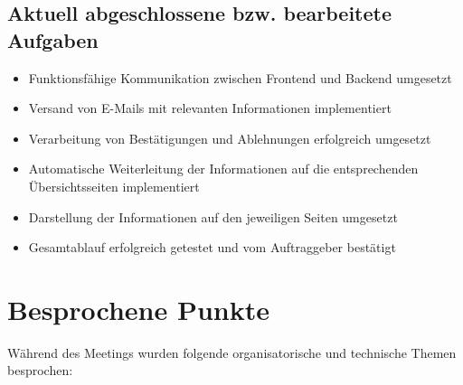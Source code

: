 \documentclass[a4paper,11pt]{article}
\begin{document}
\subsection{Aktuell abgeschlossene bzw. bearbeitete Aufgaben}

\begin{itemize}[leftmargin=1.2cm]
\item Funktionsfähige Kommunikation zwischen Frontend und Backend umgesetzt
\item Versand von E-Mails mit relevanten Informationen implementiert
\item Verarbeitung von Bestätigungen und Ablehnungen erfolgreich umgesetzt
\item Automatische Weiterleitung der Informationen auf die entsprechenden Übersichtsseiten implementiert
\item Darstellung der Informationen auf den jeweiligen Seiten umgesetzt
\item Gesamtablauf erfolgreich getestet und vom Auftraggeber bestätigt
\end{itemize}

\vspace{0.5cm}

\section{Besprochene Punkte}

Während des Meetings wurden folgende organisatorische und technische Themen besprochen:
\end{document}
